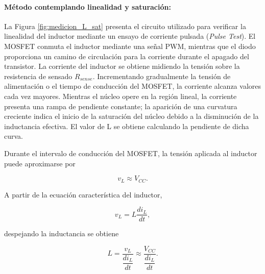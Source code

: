 \documentclass[]{article}
\begin{document}
\paragraph{Método contemplando linealidad y saturación: } 


La Figura \ref{fig:medicion_L_sat} presenta el circuito utilizado para verificar la linealidad del inductor mediante un ensayo de corriente pulsada (\textit{Pulse Test}). El MOSFET conmuta el inductor mediante una señal PWM, mientras que el diodo proporciona un camino de circulación para la corriente durante el apagado del transistor. La corriente del inductor se obtiene midiendo la tensión sobre la resistencia de sensado $R_{sense}$. Incrementando gradualmente la tensión de alimentación o el tiempo de conducción del MOSFET, la corriente alcanza valores cada vez mayores. Mientras el núcleo opere en la región lineal, la corriente presenta una rampa de pendiente constante; la aparición de una curvatura creciente indica el inicio de la saturación del núcleo debido a la disminución de la inductancia efectiva. El valor de L se obtiene calculando la pendiente de dicha curva.

Durante el intervalo de conducción del MOSFET, la tensión aplicada al
inductor puede aproximarse por

\begin{equation}
	v_L \approx V_{CC}.
\end{equation}

A partir de la ecuación característica del inductor,

\begin{equation}
	v_L=L\frac{di_L}{dt},
\end{equation}

despejando la inductancia se obtiene

\begin{equation}
	L=\frac{v_L}{\dfrac{di_L}{dt}}
	\approx
	\frac{V_{CC}}{\dfrac{di_L}{dt}}.
\end{equation}
\end{document}
